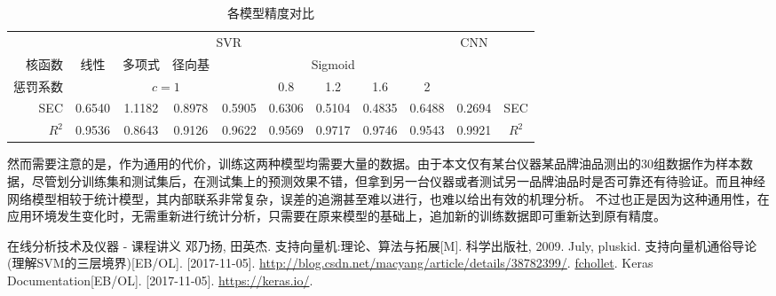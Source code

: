 \documentclass[a4paper, 12pt]{article}
\begin{document}
		\begin{table}
			\caption{各模型精度对比}
			\label{table:model-compare}
			\centering
			\small
			\begin{tabular}{r|c|c|c|c|c|c|c|c||c|c}
				\hline
				\multicolumn{9}{c||}{SVR} & \multicolumn{1}{c|}{\multirow{3}{*}{CNN}} \\
				\cline{1-9}
				核函数&线性&多项式&径向基&\multicolumn{5}{c||}{Sigmoid}& \\
				\cline{1-9}
				惩罚系数&\multicolumn{4}{c|}{$c = 1$}&0.8&1.2&1.6&2& \\
				\hline
				SEC&0.6540&1.1182&0.8978&0.5905&0.6306&0.5104&0.4835&0.6488&0.2694&SEC\\
				$R^2$&0.9536&0.8643&0.9126&0.9622&0.9569&0.9717&0.9746&0.9543&0.9921&$R^2$\\
				\hline
			\end{tabular}
		\end{table}
		
		然而需要注意的是，作为通用的代价，训练这两种模型均需要大量的数据。由于本文仅有某台仪器某品牌油品测出的30组数据作为样本数据，尽管划分训练集和测试集后，在测试集上的预测效果不错，但拿到另一台仪器或者测试另一品牌油品时是否可靠还有待验证。而且神经网络模型相较于统计模型，其内部联系非常复杂，误差的追溯甚至难以进行，也难以给出有效的机理分析。
		不过也正是因为这种通用性，在应用环境发生变化时，无需重新进行统计分析，只需要在原来模型的基础上，追加新的训练数据即可重新达到原有精度。
		
	\small
	\renewcommand{\refname}{参考资料}
	\begin{thebibliography}{9}
		\bibitem{} 在线分析技术及仪器 - 课程讲义
		\bibitem{} 邓乃扬, 田英杰. 支持向量机:理论、算法与拓展[M]. 科学出版社, 2009.
		\bibitem{} July, pluskid. 支持向量机通俗导论(理解SVM的三层境界)[EB/OL]. [2017-11-05]. \url{http://blog.csdn.net/macyang/article/details/38782399/}.
		\bibitem{} \href{https://github.com/fchollet}{fchollet}. Keras Documentation[EB/OL]. [2017-11-05]. \url{https://keras.io/}.
	\end{thebibliography}
\end{document}
